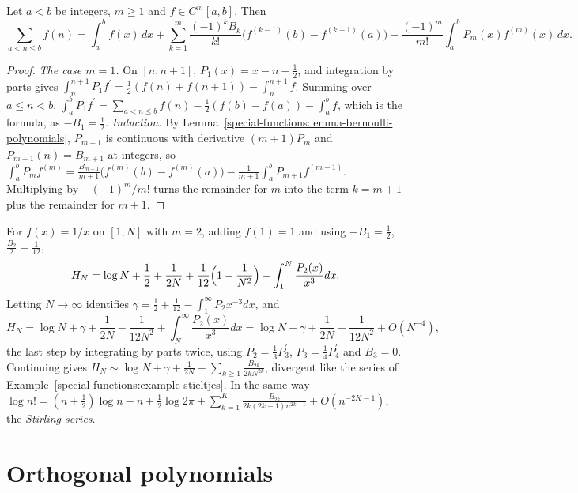\begin{theorem}\label{special-functions:theorem-euler-maclaurin}
Let $a < b$ be integers, $m \geq 1$ and $f \in C^m[a, b]$. Then
\[
\sum_{a < n \leq b}f(n) = \int_a^bf(x)\,dx + \sum_{k=1}^m\frac{(-1)^kB_k}{k!}\bigl(f^{(k-1)}(b) - f^{(k-1)}(a)\bigr) - \frac{(-1)^m}{m!}\int_a^bP_m(x)f^{(m)}(x)\,dx.
\]
\end{theorem}

\begin{proof}
\emph{The case $m = 1$.} On $[n, n + 1]$, $P_1(x) = x - n - \frac12$, and integration by parts gives $\int_n^{n+1}P_1f^{\prime} = \frac12(f(n) + f(n + 1)) - \int_n^{n+1}f$. Summing over $a \leq n < b$,
$\int_a^bP_1f^{\prime} = \sum_{a<n\leq b}f(n) - \frac12(f(b) - f(a)) - \int_a^bf$, which is the formula, as $-B_1 = \frac12$.
\emph{Induction.} By Lemma~\ref{special-functions:lemma-bernoulli-polynomials}, $P_{m+1}$ is continuous with derivative $(m + 1)P_m$ and $P_{m+1}(n) = B_{m+1}$ at integers, so
$\int_a^bP_mf^{(m)} = \frac{B_{m+1}}{m + 1}\bigl(f^{(m)}(b) - f^{(m)}(a)\bigr) - \frac{1}{m + 1}\int_a^bP_{m+1}f^{(m+1)}$. Multiplying by $-(-1)^m/m!$ turns the remainder for $m$ into the term $k = m + 1$ plus the
remainder for $m + 1$.
\end{proof}

\begin{example}\label{special-functions:example-harmonic-expansion}
For $f(x) = 1/x$ on $[1, N]$ with $m = 2$, adding $f(1) = 1$ and using $-B_1 = \frac12$, $\frac{B_2}{2} = \frac{1}{12}$,
\[
H_N = \log N + \frac12 + \frac{1}{2N} + \frac1{12}\Bigl(1 - \frac{1}{N^2}\Bigr) - \int_1^N\frac{P_2(x)}{x^3}dx.
\] Letting $N \to \infty$ identifies $\gamma = \frac12 + \frac1{12} - \int_1^\infty P_2x^{-3}dx$, and
\[
H_N = \log N + \gamma + \frac{1}{2N} - \frac{1}{12N^2} + \int_N^\infty\frac{P_2(x)}{x^3}dx = \log N + \gamma + \frac{1}{2N} - \frac{1}{12N^2} + O(N^{-4}),
\]
the last step by integrating by parts twice, using $P_2 = \frac13P_3^{\prime}$, $P_3 = \frac14P_4^{\prime}$ and $B_3 = 0$. Continuing gives $H_N \sim \log N + \gamma + \frac{1}{2N} - \sum_{k \geq 1}\frac{B_{2k}}{2kN^{2k}}$, divergent like the series of Example~\ref{special-functions:example-stieltjes}.
In the same way $\log n! = (n + \frac12)\log n - n + \frac12\log 2\pi + \sum_{k=1}^{K}\frac{B_{2k}}{2k(2k - 1)n^{2k-1}} + O(n^{-2K-1})$, the \emph{Stirling series}.
\end{example}

\section{Orthogonal polynomials}\label{special-functions:section-orthogonal-polynomials}

